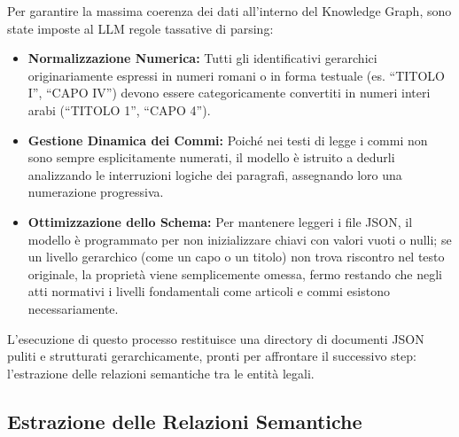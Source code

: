 Per garantire la massima coerenza dei dati all'interno del Knowledge Graph, sono state imposte al LLM regole tassative di parsing:

\begin{itemize}
    \item \textbf{Normalizzazione Numerica:} Tutti gli identificativi gerarchici originariamente espressi in numeri romani o in forma testuale (es. ``TITOLO I'', ``CAPO IV'') devono essere categoricamente convertiti in numeri interi arabi (``TITOLO 1'', ``CAPO 4'').
    \item \textbf{Gestione Dinamica dei Commi:} Poiché nei testi di legge i commi non sono sempre esplicitamente numerati, il modello è istruito a dedurli analizzando le interruzioni logiche dei paragrafi, assegnando loro una numerazione progressiva.
    \item \textbf{Ottimizzazione dello Schema:} Per mantenere leggeri i file JSON, il modello è programmato per non inizializzare chiavi con valori vuoti o nulli; se un livello gerarchico (come un capo o un titolo) non trova riscontro nel testo originale, la proprietà viene semplicemente omessa, fermo restando che negli atti normativi i livelli fondamentali come articoli e commi esistono necessariamente.
\end{itemize}

L'esecuzione di questo processo restituisce una directory di documenti JSON puliti e strutturati gerarchicamente, pronti per affrontare il successivo step: l'estrazione delle relazioni semantiche tra le entità legali.

\subsection{Estrazione delle Relazioni Semantiche}
\label{sec:estrazione_relazioni}

